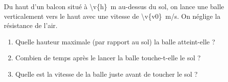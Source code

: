 Du haut d'un balcon situé à \qty{\v{h}}{m} au-dessus du sol, on lance une balle verticalement vers le haut avec une vitesse de \qty{\v{v0}}{m/s}. On néglige la résistance de l'air.

\begin{enumerate}[label=\alph*)]
    \item Quelle hauteur maximale (par rapport au sol) la balle atteint-elle ?
    \item Combien de temps après le lancer la balle touche-t-elle le sol ?
    \item Quelle est la vitesse de la balle juste avant de toucher le sol ?
\end{enumerate}
